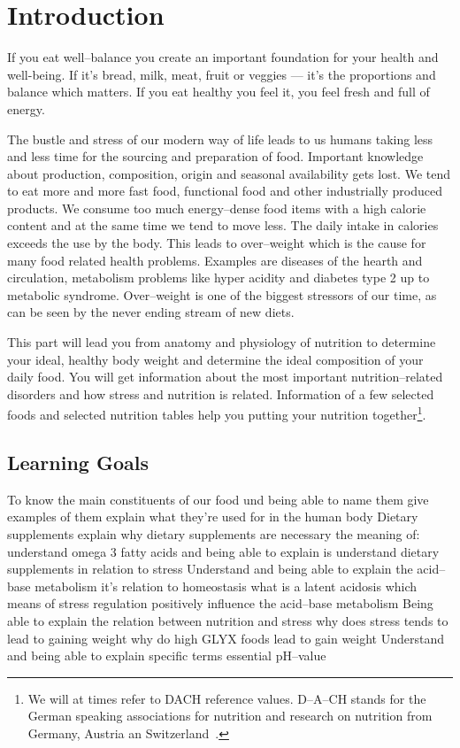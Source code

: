 \documentclass[../main.tex]{subfiles}
\begin{document}
\chapter{Introduction}

If you eat well--balance you create an important foundation for your health and well-being.
If it's bread, milk, meat, fruit or veggies --- it's the proportions and balance which matters.
If you eat healthy you feel it, you feel fresh and full of energy.

The bustle and stress of our modern way of life leads to us humans taking less and less time for the sourcing and preparation of food.
Important knowledge about production, composition, origin and seasonal availability gets lost.
We tend to eat more and more fast food, functional food and other industrially produced products.
We consume too much energy--dense food items with a high calorie content and at the same time we tend to move less.
The daily intake in calories exceeds the use by the body. This leads to over--weight which is the cause for many food related health problems.
Examples are diseases of the hearth and circulation, metabolism problems like hyper acidity and diabetes type 2 up to metabolic syndrome.
Over--weight is one of the biggest stressors of our time, as can be seen by the never ending stream of new diets.

This part will lead you from anatomy and physiology of nutrition to determine your ideal, healthy body weight and determine the ideal composition of your daily food.
You will get information about the most important nutrition--related disorders and how stress and nutrition is related.
Information of a few selected foods and selected nutrition tables help you putting your nutrition together\footnote{We will at times refer to DACH reference values. D--A--CH stands for the German speaking associations for nutrition and research on nutrition from Germany, Austria an Switzerland~\cite{DACH}.}.

\section{Learning Goals}

\begin{outline}
  \1 To know the main constituents of our food und
  \2 being able to name them
  \2 give examples of them
  \2 explain what they're used for in the human body
  \1 Dietary supplements
  \2 explain why dietary supplements are necessary
  \2 the meaning of:
  \3 understand omega 3 fatty acids and being able to explain is
  \3 understand dietary supplements in relation to stress
  \1 Understand and being able to explain the acid--base metabolism
  \2 it's relation to homeostasis
  \2 what is a latent acidosis
  \2 which means of stress regulation positively influence the acid--base metabolism
  \1 Being able to explain the relation between nutrition and stress
  \2 why does stress tends to lead to gaining weight
  \2 why do high GLYX foods lead to gain weight
  \1 Understand and being able to explain specific terms
  \2 essential
  \2 pH--value
\end{outline}
\end{document}
